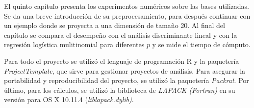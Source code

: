 El quinto capítulo presenta los experimentos numéricos sobre las bases utilizadas. Se da una breve introducción de su preprocesamiento, para después continuar con un ejemplo donde se proyecta a una dimensión de tamaño 20. Al final del capítulo se compara el desempeño con el análisis discriminante lineal y con la regresión logística mulitinomial para diferentes $p$ y se mide el tiempo de cómputo.

Para todo el proyecto se utilizó el lenguaje de programación R y la paquetería \textit{ProjectTemplate}, que sirve para gestionar proyectos de análisis. Para asegurar la portabilidad y reproducibilidad del proyecto,
se utilizó la paquetería \textit{Packrat}. Por último, para los cálculos, se utilizó la biblioteca de \textit{LAPACK (Fortran)}  en su versión para OS X 10.11.4 (\textit{liblapack.dylib)}. 

